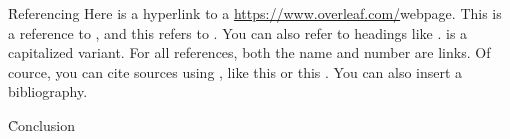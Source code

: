 \documentclass{ieee}
\begin{document}

\h{Referencing}
Here is a hyperlink to a \url{https://www.overleaf.com/}{webpage}. This is a reference to , and this refers to . You can also refer to headings like .  is a capitalized variant. For all references, both the name and number are links. Of cource, you can cite sources using \c{\cite{...}}, like this \cite{minted} or this \cite{tabularray}. You can also insert a bibliography.

\h{Conclusion}

\toc %

\end{document}
